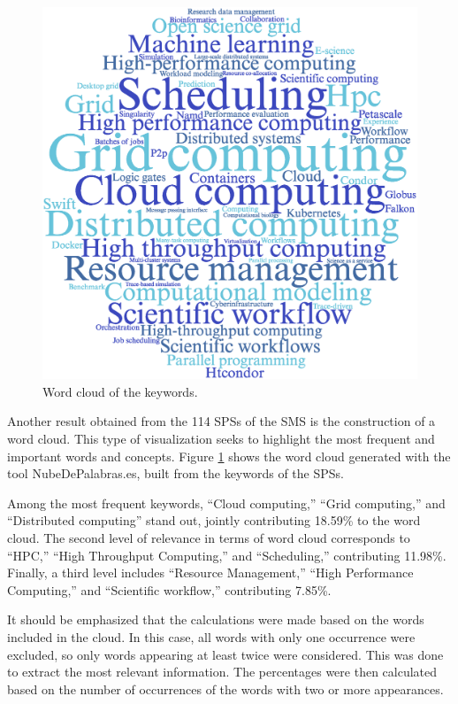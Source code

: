 \begin{figure}
	\centering
	\includegraphics[scale=0.4]{resources/figures/wordcloud.eps}
	\caption{Word cloud of the keywords.}
	\label{fig:WordCloud}
\end{figure}

Another result obtained from the 114 SPSs of the SMS is the construction of a word cloud. This type of visualization seeks to highlight the most frequent and important words and concepts. Figure \ref{fig:WordCloud} shows the word cloud generated with the tool NubeDePalabras.es, built from the keywords of the SPSs.

Among the most frequent keywords, ``Cloud computing,'' ``Grid computing,'' and ``Distributed computing'' stand out, jointly contributing 18.59\% to the word cloud. The second level of relevance in terms of word cloud corresponds to ``HPC,'' ``High Throughput Computing,'' and ``Scheduling,'' contributing 11.98\%. Finally, a third level includes ``Resource Management,'' ``High Performance Computing,'' and ``Scientific workflow,'' contributing 7.85\%.

It should be emphasized that the calculations were made based on the words included in the cloud. In this case, all words with only one occurrence were excluded, so only words appearing at least twice were considered. This was done to extract the most relevant information. The percentages were then calculated based on the number of occurrences of the words with two or more appearances.
